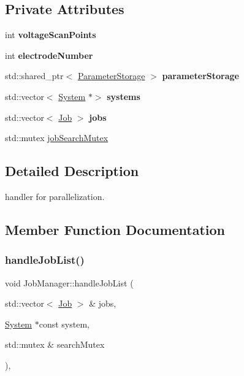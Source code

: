 \subsection*{Private Attributes}
\begin{DoxyCompactItemize}
\item 
\mbox{\label{classJobManager_af8fb3e539eda8e070bdf903b6b334ef4}} 
int {\bfseries voltage\+Scan\+Points}
\item 
\mbox{\label{classJobManager_ac5920380c45cbf6ba669af6c36889955}} 
int {\bfseries electrode\+Number}
\item 
\mbox{\label{classJobManager_a9b463168e9fb04ac4452081a5c481c56}} 
std\+::shared\+\_\+ptr$<$ \hyperlink{classParameterStorage}{Parameter\+Storage} $>$ {\bfseries parameter\+Storage}
\item 
\mbox{\label{classJobManager_a0d5c04f0837027d5601e6468ec4fcab5}} 
std\+::vector$<$ \hyperlink{classSystem}{System} $\ast$$>$ {\bfseries systems}
\item 
\mbox{\label{classJobManager_adeb38892b4b5728b24368f3362442d45}} 
std\+::vector$<$ \hyperlink{classJob}{Job} $>$ {\bfseries jobs}
\item 
std\+::mutex \hyperlink{classJobManager_af64a4f6d4843c3d5ca12c801c25666ac}{job\+Search\+Mutex}
\end{DoxyCompactItemize}


\subsection{Detailed Description}
handler for parallelization. 

\subsection{Member Function Documentation}
\mbox{\label{classJobManager_a478365d6287e01484a64105dcd81520e}} 
\subsubsection{\texorpdfstring{handle\+Job\+List()}{handleJobList()}}
{\footnotesize\ttfamily void Job\+Manager\+::handle\+Job\+List (\begin{DoxyParamCaption}\item[{std\+::vector$<$ \hyperlink{classJob}{Job} $>$ \&}]{jobs,  }\item[{\hyperlink{classSystem}{System} $\ast$const}]{system,  }\item[{std\+::mutex \&}]{search\+Mutex }\end{DoxyParamCaption})\hspace{0.3cm}{\ttfamily [static]}, {\ttfamily [private]}}

